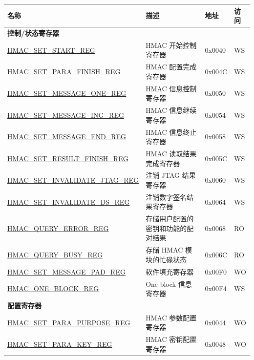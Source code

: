 \begin{longtable}{ | p{5.5cm} | p{6cm} | p{2cm} | p{0.8cm} | }
    \hline\rowcolor{lightgray}
    \textbf{名称} & \textbf{描述} & \textbf{地址} & \textbf{访问} \\ \hline
    \endhead
    \multicolumn{4}{|l|}{\textbf{控制/状态寄存器}} \\ \hline
    \hyperref[regdesc:HMACSETSTARTREG]{HMAC\_SET\_START\_REG} & HMAC 开始控制寄存器 & 0x0040 & WS \\ \hline
    \hyperref[regdesc:HMACSETPARAFINISHREG]{HMAC\_SET\_PARA\_FINISH\_REG} & HMAC 配置完成寄存器 & 0x004C & WS \\ \hline
    \hyperref[regdesc:HMACSETMESSAGEONEREG]{HMAC\_SET\_MESSAGE\_ONE\_REG} & HMAC 信息控制寄存器 & 0x0050 & WS \\ \hline
    \hyperref[regdesc:HMACSETMESSAGEINGREG]{HMAC\_SET\_MESSAGE\_ING\_REG} & HMAC 信息继续寄存器 & 0x0054 & WS \\ \hline
    \hyperref[regdesc:HMACSETMESSAGEENDREG]{HMAC\_SET\_MESSAGE\_END\_REG} & HMAC 信息终止寄存器 & 0x0058 & WS \\ \hline
    \hyperref[regdesc:HMACSETRESULTFINISHREG]{HMAC\_SET\_RESULT\_FINISH\_REG} & HMAC 读取结果完成寄存器 & 0x005C & WS \\ \hline
    \hyperref[regdesc:HMACSETINVALIDATEJTAGREG]{HMAC\_SET\_INVALIDATE\_JTAG\_REG} & 注销 JTAG 结果寄存器 & 0x0060 & WS \\ \hline
    \hyperref[regdesc:HMACSETINVALIDATEDSREG]{HMAC\_SET\_INVALIDATE\_DS\_REG} & 注销数字签名结果寄存器 & 0x0064 & WS \\ \hline
    \hyperref[regdesc:HMACQUERYERRORREG]{HMAC\_QUERY\_ERROR\_REG} &  存储用户配置的密钥和功能的配对结果 & 0x0068 & RO \\ \hline
    \hyperref[regdesc:HMACQUERYBUSYREG]{HMAC\_QUERY\_BUSY\_REG} & 存储 HMAC 模块的忙碌状态 & 0x006C & RO \\ \hline
    \hyperref[regdesc:HMACSETMESSAGEPADREG]{HMAC\_SET\_MESSAGE\_PAD\_REG} & 软件填充寄存器 & 0x00F0 & WO \\ \hline
    \hyperref[regdesc:HMACONEBLOCKREG]{HMAC\_ONE\_BLOCK\_REG} & One block 信息寄存器 & 0x00F4 & WS \\ \hline
    \multicolumn{4}{|l|}{\textbf{配置寄存器}} \\ \hline
    \hyperref[regdesc:HMACSETPARAPURPOSEREG]{HMAC\_SET\_PARA\_PURPOSE\_REG} & HMAC 参数配置寄存器 & 0x0044 & WO \\ \hline
    \hyperref[regdesc:HMACSETPARAKEYREG]{HMAC\_SET\_PARA\_KEY\_REG} & HMAC 密钥配置寄存器 & 0x0048 & WO \\ \hline

\end{longtable}
